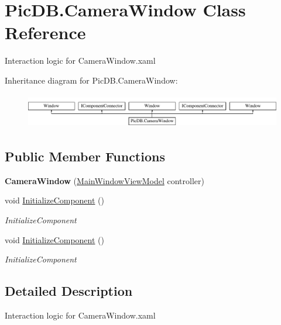 \hypertarget{class_pic_d_b_1_1_camera_window}{}\section{Pic\+D\+B.\+Camera\+Window Class Reference}
\label{class_pic_d_b_1_1_camera_window}


Interaction logic for Camera\+Window.\+xaml  


Inheritance diagram for Pic\+D\+B.\+Camera\+Window\+:\begin{figure}[H]
\begin{center}
\leavevmode
\includegraphics[height=1.523810cm]{class_pic_d_b_1_1_camera_window}
\end{center}
\end{figure}
\subsection*{Public Member Functions}
\begin{DoxyCompactItemize}
\item 
\mbox{\label{class_pic_d_b_1_1_camera_window_a3a7d76b4429c79da2323e391550b8701}} 
{\bfseries Camera\+Window} (\mbox{\hyperlink{class_pic_d_b_1_1_view_models_1_1_main_window_view_model}{Main\+Window\+View\+Model}} controller)
\item 
void \mbox{\hyperlink{class_pic_d_b_1_1_camera_window_a0f76da75ec227a474e47daa78d549653}{Initialize\+Component}} ()
\begin{DoxyCompactList}\small\item\em Initialize\+Component \end{DoxyCompactList}\item 
void \mbox{\hyperlink{class_pic_d_b_1_1_camera_window_a0f76da75ec227a474e47daa78d549653}{Initialize\+Component}} ()
\begin{DoxyCompactList}\small\item\em Initialize\+Component \end{DoxyCompactList}\end{DoxyCompactItemize}


\subsection{Detailed Description}
Interaction logic for Camera\+Window.\+xaml 

